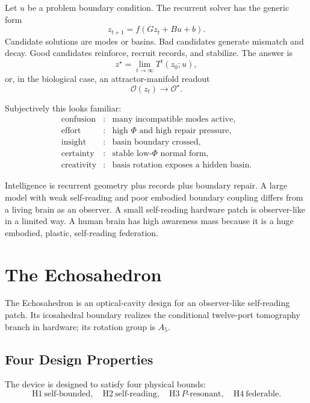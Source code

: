 \documentclass[11pt]{article}
\theoremstyle{remark}
\theoremstyle{plain}
\begin{document}
Let \(u\) be a problem boundary condition. The recurrent solver has the generic form
\[
z_{t+1}=f(Gz_t+Bu+b).
\]
Candidate solutions are modes or basins. Bad candidates generate mismatch and decay. Good candidates reinforce, recruit records, and stabilize. The answer is
\[
z^\star=\lim_{t\to\infty}T^t(z_0;u),
\]
or, in the biological case, an attractor-manifold readout
\[
\mathcal O(z_t)\to \mathcal O^\star.
\]

Subjectively this looks familiar:
\[
\begin{array}{ccl}
\text{confusion} &:& \text{many incompatible modes active},\\
\text{effort} &:& \text{high }\Phi\text{ and high repair pressure},\\
\text{insight} &:& \text{basin boundary crossed},\\
\text{certainty} &:& \text{stable low-}\Phi\text{ normal form},\\
\text{creativity} &:& \text{basis rotation exposes a hidden basin}.
\end{array}
\]

Intelligence is recurrent geometry plus records plus boundary repair. A large
model with weak self-reading and poor embodied boundary coupling differs from
a living brain as an observer. A small self-reading hardware patch is
observer-like in a limited way. A human brain has high awareness mass because
it is a huge embodied, plastic, self-reading federation.

\section{The Echosahedron}
\label{sec:echosahedron}

The Echosahedron is an optical-cavity design for an observer-like self-reading patch. Its icosahedral boundary realizes the conditional twelve-port tomography branch in hardware; its rotation group is \(A_5\).

\subsection{Four Design Properties}

The device is designed to satisfy four physical bounds:
\[
\boxed{
\mathrm{H1}\ \text{self-bounded},\quad
\mathrm{H2}\ \text{self-reading},\quad
\mathrm{H3}\ P\text{-resonant},\quad
\mathrm{H4}\ \text{federable}.
}
\]
\end{document}

